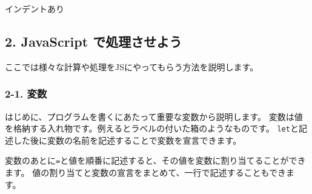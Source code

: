 インデントあり

\begin{Shaded}
\begin{Highlighting}[]
 \NormalTok{ () \{}
  \OperatorTok{=} \OperatorTok{;}
  \OperatorTok{=} \OperatorTok{;}\OperatorTok{\textless{}} \OperatorTok{;}\OperatorTok{++}\NormalTok{) \{}
    \OperatorTok{;}
\NormalTok{  \}}
\NormalTok{\}}
\end{Highlighting}
\end{Shaded}

\subsection{2. JavaScript
で処理させよう}\label{javascript-ux3067ux51e6ux7406ux3055ux305bux3088ux3046}

ここでは様々な計算や処理をJSにやってもらう方法を説明します。

\subsubsection{2-1. 変数}\label{ux5909ux6570}

はじめに、プログラムを書くにあたって重要な変数から説明します。
変数は値を格納する入れ物です。例えるとラベルの付いた箱のようなものです。
\texttt{let}と記述した後に変数の名前を記述することで変数を宣言できます。

\begin{Shaded}
\begin{Highlighting}[]
\OperatorTok{;}
\end{Highlighting}
\end{Shaded}

変数のあとに\texttt{=}と値を順番に記述すると、その値を変数に割り当てることができます。
値の割り当てと変数の宣言をまとめて、一行で記述することもできます。

\begin{Shaded}
\begin{Highlighting}[]
\OperatorTok{;}
\OperatorTok{=} \OperatorTok{;}

\OperatorTok{=} \OperatorTok{;}
\end{Highlighting}
\end{Shaded}

